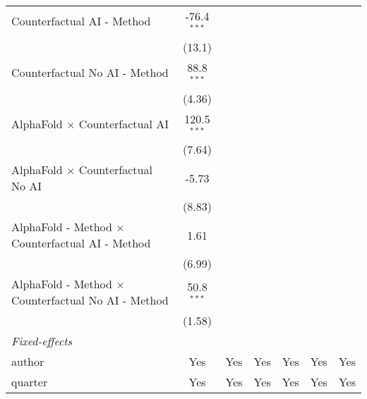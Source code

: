 \begin{tabular}{lcccccc}
   Counterfactual AI - Method                                 & -76.4$^{***}$ &        &              &              &               &   \\   
                                                              & (13.1)        &        &              &              &               &   \\   
   Counterfactual No AI - Method                              & 88.8$^{***}$  &        &              &              &               &   \\   
                                                              & (4.36)        &        &              &              &               &   \\   
   AlphaFold $\times$ Counterfactual AI                       & 120.5$^{***}$ &        &              &              &               &   \\   
                                                              & (7.64)        &        &              &              &               &   \\   
   AlphaFold $\times$ Counterfactual No AI                    & -5.73         &        &              &              &               &   \\   
                                                              & (8.83)        &        &              &              &               &   \\   
   AlphaFold - Method $\times$ Counterfactual AI - Method     & 1.61          &        &              &              &               &   \\   
                                                              & (6.99)        &        &              &              &               &   \\   
   AlphaFold - Method $\times$ Counterfactual No AI - Method  & 50.8$^{***}$  &        &              &              &               &   \\   
                                                              & (1.58)        &        &              &              &               &   \\   
   \midrule
   \emph{Fixed-effects}\\
   author                                                     & Yes           & Yes    & Yes          & Yes          & Yes           & Yes\\  
   quarter                                                    & Yes           & Yes    & Yes          & Yes          & Yes           & Yes\\  

\end{tabular}
